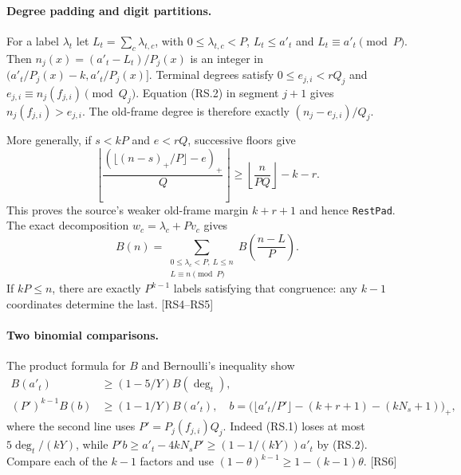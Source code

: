 \documentclass[11pt,a4paper]{article}
\numberwithin{equation}{section}
\theoremstyle{remark}\newtheorem{remark}[theorem]{Remark}
\begin{document}
\paragraph{Degree padding and digit partitions.}
For a label $\lambda_t$ let $L_t=\sum_c\lambda_{t,c}$, with
$0\le\lambda_{t,c}<P$, $L_t\le a'_t$ and $L_t\equiv a'_t\pmod P$.
Then $n_j(x)=(a'_t-L_t)/P_j(x)$ is an integer in
$(a'_t/P_j(x)-k,a'_t/P_j(x)]$. Terminal degrees satisfy
$0\le e_{j,i}<rQ_j$ and $e_{j,i}\equiv n_j(f_{j,i})\pmod{Q_j}$.
Equation (RS.2) in segment $j+1$ gives $n_j(f_{j,i})>e_{j,i}$.
The old-frame degree is therefore exactly $(n_j-e_{j,i})/Q_j$.

More generally, if $s<kP$ and $e<rQ$, successive floors give
\[
 \left\lfloor\frac{(\lfloor(n-s)_+/P\rfloor-e)_+}{Q}\right\rfloor
 \ge\left\lfloor\frac n{PQ}\right\rfloor-k-r.
\]
This proves the source's weaker old-frame margin $k+r+1$ and hence
\texttt{RestPad}. The exact decomposition $w_c=\lambda_c+Pv_c$ gives
\[
 B(n)=\sum_{\substack{0\le\lambda_c<P,\ L\le n\\L\equiv n\pmod P}}
 B\!\left(\frac{n-L}{P}\right).
 \tag{RS.4}
\]
If $kP\le n$, there are exactly $P^{k-1}$ labels satisfying that
congruence: any $k-1$ coordinates determine the last. \textsf{[RS4--RS5]}

\paragraph{Two binomial comparisons.}
The product formula for $B$ and Bernoulli's inequality show
\[
\begin{split}
 B(a'_t)&\ge(1-5/Y)B(\deg_t),\\
 (P')^{k-1}B(b)&\ge(1-1/Y)B(a'_t),
 \quad b=\bigl(\lfloor a'_t/P'\rfloor-(k+r+1)-(kN_s+1)\bigr)_+,
\end{split}\tag{RS.5}
\]
where the second line uses $P'=P_j(f_{j,i})Q_j$.
Indeed (RS.1) loses at most $5\deg_t/(kY)$, while
$P'b\ge a'_t-4kN_sP'\ge(1-1/(kY))a'_t$ by (RS.2).
Compare each of the $k-1$ factors and use $(1-\theta)^{k-1}\ge1-(k-1)\theta$.
\textsf{[RS6]}
\end{document}
